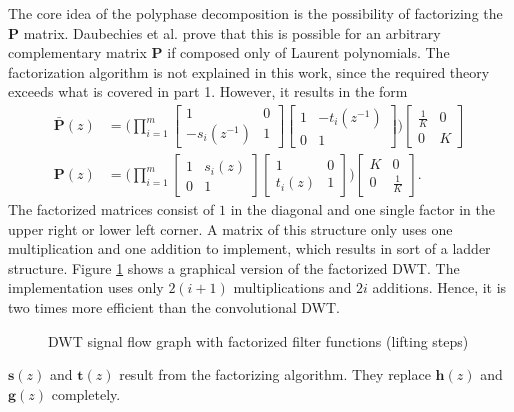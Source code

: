 \begin{refsection}
The core idea of the polyphase decomposition is the possibility of factorizing the $\bm P$ matrix.
Daubechies et al. prove that this is possible for an arbitrary complementary matrix $\bm P$ if composed only of Laurent polynomials.
The factorization algorithm is not explained in this work, since the required theory exceeds what is covered in part 1.
However, it results in the form
\begin{align}
	\bm{\bar P}(z) &=
	\Biggl(
	\prod_{i=1}^{m}
	\begin{bmatrix}
		1 & 0 \\
		-s_i(z^{-1}) & 1
	\end{bmatrix}
	\begin{bmatrix}
		1 & -t_i(z^{-1}) \\
		0 & 1
	\end{bmatrix}
	\Biggr)
	\begin{bmatrix}
		\frac{1}{K} & 0 \\
		0 & K
	\end{bmatrix}
	\\
	\bm P(z) &=
	\Biggl(
	\prod_{i=1}^{m}
	\begin{bmatrix}
		1 & s_i(z) \\
		0 & 1
	\end{bmatrix}
	\begin{bmatrix}
		1 & 0 \\
		t_i(z) & 1
	\end{bmatrix}
	\Biggr)
	\begin{bmatrix}
		K & 0 \\
		0 & \frac{1}{K}
	\end{bmatrix}
	.
\end{align}
The factorized matrices consist of $1$ in the diagonal and one single factor in the upper right or lower left corner.
A matrix of this structure only uses one multiplication and one addition to implement, which results in sort of a ladder structure.
Figure \ref{fpga:fig:liftingStepFactorization} shows a graphical version of the factorized DWT.
The implementation uses only $2(i+1)$ multiplications and $2i$ additions.
Hence, it is two times more efficient than the convolutional DWT.
\begin{figure}
	\centering
	
	
	\caption{DWT signal flow graph with factorized filter functions (lifting steps)}
	\label{fpga:fig:liftingStepFactorization}
\end{figure}
$\bm s(z)$ and $\bm t(z)$ result from the factorizing algorithm.
They replace $\bm h(z)$ and $\bm g(z)$ completely.


\end{refsection}
